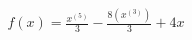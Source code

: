 \documentclass[preview]{standalone}
\begin{document}
\begin{align*}
f(x)=\frac{x^(5)}{3}-\frac{8(x^(3))}{3}+4x
\end{align*}
\end{document}
